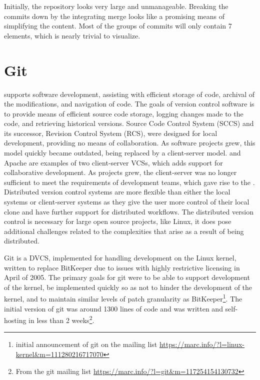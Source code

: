 Initially, the repository looks very large and unmanageable. Breaking
the commits down by the integrating merge looks like a promising means
of simplifying the content. Most of the groups of commits will only
contain 7 elements, which is nearly trivial to visualize.

\section{Git}\label{sec:git}

 supports software development,
assisting with efficient storage of code, archival of the modifications,
and navigation of code. The goals of version control software is to
provide means of efficient source code storage, logging changes made to
the code, and retrieving historical versions. Source Code Control System
(SCCS) and its successor, Revision Control System (RCS), were designed
for local development, providing no means of collaboration. As software
projects grew, this model quickly became outdated, being replaced by a
client-server model.  and Apache
 are examples of two client-server VCSs, which
adds support for collaborative development. As projects grew, the
client-server was no longer sufficient to meet the requirements of
development teams, which gave rise to the . Distributed version control systems are more
flexible than either the local systems or client-server systems as they
give the user more control of their local clone and have further support
for distributed workflows. The distributed version control is necessary
for large open source projects, like Linux, it does pose additional
challenges related to the complexities that arise as a result of being
distributed.

Git is a DVCS, implemented for handling development on the Linux kernel,
written to replace BitKeeper due to issues with highly restrictive
licensing in April of 2005. The primary goals for git were to be able to
support development of the kernel, be implemented quickly so as not to
hinder the development of the kernel, and to maintain similar levels of
patch granularity as BitKeeper\footnote{initial announcement of git on
  the mailing list
  \url{https://marc.info/?l=linux-kernel&m=111280216717070}}. The
initial version of git was around 1300 lines of code and was written and
self-hosting in less than 2 weeks\footnote{From the git mailing list
  \url{https://marc.info/?l=git&m=117254154130732}}.

